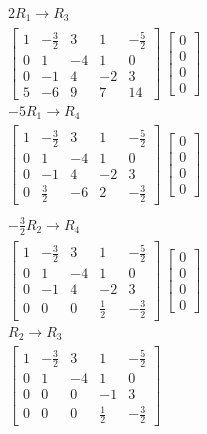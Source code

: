 \documentclass[11pt]{article}
\begin{document}
\begin{flushleft}
\begin{align*}
&2R_1 \rightarrow R_3 \\
&\begin{bmatrix}
1 & -\frac{3}{2} & 3 & 1 & -\frac{5}{2} \\
0 & 1 & -4 & 1 & 0 \\
0 & -1 & 4 & -2 & 3 \\
5 & -6 & 9 & 7 & 14
\end{bmatrix}\
\begin{bmatrix}
0 \\ 0 \\ 0 \\ 0
\end{bmatrix}\\
& -5 R_1 \rightarrow R_4 \\
&\begin{bmatrix}
1 & -\frac{3}{2} & 3 & 1 & -\frac{5}{2} \\
0 & 1 & -4 & 1 & 0 \\
0 & -1 & 4 & -2 & 3 \\
0 & \frac{3}{2} & -6 & 2 & -\frac{3}{2}
\end{bmatrix}\
\begin{bmatrix}
0 \\ 0 \\ 0 \\ 0
\end{bmatrix}\\
\end{align*}
\begin{align*}
&-\frac{3}{2}R_2 \rightarrow R_4 \\
&\begin{bmatrix}
1 & -\frac{3}{2} & 3 & 1 & -\frac{5}{2} \\
0 & 1 & -4 & 1 & 0 \\
0 & -1 & 4 & -2 & 3 \\
0 & 0 & 0 & \frac{1}{2} & -\frac{3}{2}
\end{bmatrix}\
\begin{bmatrix}
0 \\ 0 \\ 0 \\ 0
\end{bmatrix}\\
&R_2 \rightarrow R_3 \\
&\begin{bmatrix}
1 & -\frac{3}{2} & 3 & 1 & -\frac{5}{2} \\
0 & 1 & -4 & 1 & 0 \\
0 & 0 & 0 & -1 & 3 \\
0 & 0 & 0 & \frac{1}{2} & -\frac{3}{2}

\end{bmatrix}
\end{align*}
\end{flushleft}
\end{document}
